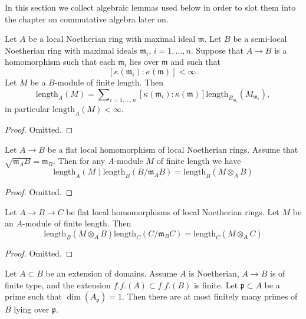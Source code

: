 \noindent
In this section we collect algebraic lemmas used below in order to
slot them into the chapter on commutative algebra later on.

\begin{lemma}
\label{lemma-pushdown-module}
Let $A$ be a local Noetherian ring with maximal ideal $\mathfrak m$.
Let $B$ be a semi-local Noetherian ring with maximal ideals $\mathfrak m_i$,
$i = 1, \ldots, n$.
Suppose that $A \to B$ is a homomorphism such that each $\mathfrak m_i$
lies over $\mathfrak m$ and such that
$$
[\kappa(\mathfrak m_i) : \kappa(\mathfrak m)] < \infty.
$$
Let $M$ be a $B$-module of finite length.
Then
$$
\text{length}_A(M) = \sum\nolimits_{i = 1, \ldots, n}
[\kappa(\mathfrak m_i) : \kappa(\mathfrak m)]
\text{length}_{B_{\mathfrak m_i}}(M_{\mathfrak m_i}),
$$
in particular $\text{length}_A(M) < \infty$.
\end{lemma}

\begin{proof}
Omitted.
\end{proof}

\begin{lemma}
\label{lemma-pullback-module}
Let $A \to B$ be a flat local homomorphism of local Noetherian rings.
Assume that $\sqrt{\mathfrak m_A B} = \mathfrak m_B$.
Then for any $A$-module $M$ of finite length we have
$$
\text{length}_A(M) \text{length}_B(B/\mathfrak m_AB)
=
\text{length}_B(M \otimes_A B)
$$
\end{lemma}

\begin{proof}
Omitted.
\end{proof}

\begin{lemma}
\label{lemma-pullback-transitive}
Let $A \to B \to C$ be flat local homomorphisms of local Noetherian rings.
Let $M$ be an $A$-module of finite length.
Then
$$
\text{length}_B(M \otimes_A B) \text{length}_C(C/\mathfrak m_B C)
=
\text{length}_C(M \otimes_A C)
$$
\end{lemma}

\begin{proof}
Omitted.
\end{proof}

\begin{lemma}
\label{lemma-finite-in-codim-1}
Let $A \subset B$ be an extension of domains.
Assume $A$ is Noetherian, $A \to B$ is of finite type, and
the extension $f.f.(A) \subset f.f.(B)$ is finite.
Let $\mathfrak p \subset A$ be a prime such that $\dim(A_\mathfrak p) = 1$.
Then there are at most finitely many primes of $B$ lying over $\mathfrak p$.
\end{lemma}

